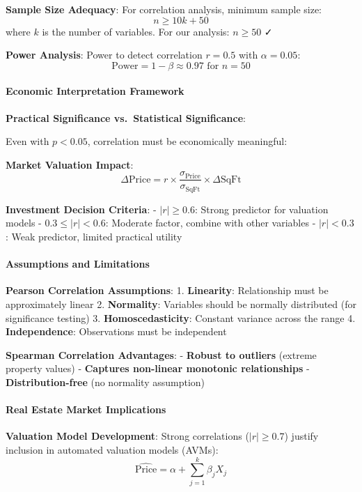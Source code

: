 \documentclass[11pt]{article}
\begin{document}
\textbf{Sample Size Adequacy}: For correlation analysis, minimum sample
size: \[n \geq 10k + 50\] where \(k\) is the number of variables. For
our analysis: \(n \geq 50\) ✓

\textbf{Power Analysis}: Power to detect correlation \(r = 0.5\) with
\(\alpha = 0.05\):
\[\text{Power} = 1 - \beta \approx 0.97 \text{ for } n = 50\]

\paragraph{Economic Interpretation
Framework}\label{economic-interpretation-framework}

\textbf{Practical Significance vs.~Statistical Significance}:

Even with \(p < 0.05\), correlation must be economically meaningful:

\textbf{Market Valuation Impact}:
\[\Delta \text{Price} = r \times \frac{\sigma_{\text{Price}}}{\sigma_{\text{SqFt}}} \times \Delta \text{SqFt}\]

\textbf{Investment Decision Criteria}: - \(|r| \geq 0.6\): Strong
predictor for valuation models - \(0.3 \leq |r| < 0.6\): Moderate
factor, combine with other variables - \(|r| < 0.3\): Weak predictor,
limited practical utility

\paragraph{Assumptions and
Limitations}\label{assumptions-and-limitations}

\textbf{Pearson Correlation Assumptions}: 1. \textbf{Linearity}:
Relationship must be approximately linear 2. \textbf{Normality}:
Variables should be normally distributed (for significance testing) 3.
\textbf{Homoscedasticity}: Constant variance across the range 4.
\textbf{Independence}: Observations must be independent

\textbf{Spearman Correlation Advantages}: - \textbf{Robust to outliers}
(extreme property values) - \textbf{Captures non-linear monotonic
relationships} - \textbf{Distribution-free} (no normality assumption)

\paragraph{Real Estate Market
Implications}\label{real-estate-market-implications}

\textbf{Valuation Model Development}: Strong correlations
(\(|r| \geq 0.7\)) justify inclusion in automated valuation models
(AVMs): \[\hat{\text{Price}} = \alpha + \sum_{j=1}^{k} \beta_j X_j\]
\end{document}
